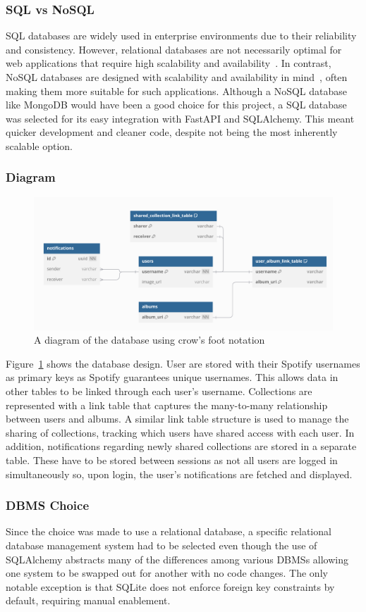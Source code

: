 \subsubsection{SQL vs NoSQL}
SQL databases are widely used in enterprise environments due to their reliability and consistency. However, relational databases are not necessarily optimal for web applications that require high scalability and availability~\cite{GANESHCHANDRA201513}. In contrast, NoSQL databases are designed with scalability and availability in mind~\cite{NoSQL}, often making them more suitable for such applications.
Although a NoSQL database like MongoDB would have been a good choice for this project, a SQL database was selected for its easy integration with FastAPI and SQLAlchemy. This meant quicker development and cleaner code, despite not being the most inherently scalable option.

\subsubsection{Diagram}
\begin{figure} [H]
    \centering
    \includegraphics[width=0.6\linewidth]{figures/db_diagram.png}
    \caption{A diagram of the database using crow's foot notation}
    \label{fig:database-diagram}
\end{figure}

Figure~\ref{fig:database-diagram} shows the database design. User are stored with their Spotify usernames as primary keys as Spotify guarantees unique usernames. This allows data in other tables to be linked through each user’s username. Collections are represented with a link table that captures the many-to-many relationship between users and albums. A similar link table structure is used to manage the sharing of collections, tracking which users have shared access with each user. In addition, notifications regarding newly shared collections are stored in a separate table. These have to be stored between sessions as not all users are logged in simultaneously so, upon login, the user's notifications are fetched and displayed.

\subsubsection{DBMS Choice}
Since the choice was made to use a relational database, a specific relational database management system had to be selected even though the use of SQLAlchemy abstracts many of the differences among various DBMSs allowing one system to be swapped out for another with no code changes. The only notable exception is that SQLite does not enforce foreign key constraints by default, requiring manual enablement.

